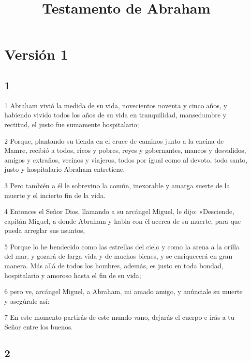 

\title{Testamento de Abraham}

\part{Versión 1}

\chapter{1}

\par 1 Abraham vivió la medida de su vida, novecientos noventa y cinco años, y habiendo vivido todos los años de su vida en tranquilidad, mansedumbre y rectitud, el justo fue sumamente hospitalario;

\par 2 Porque, plantando su tienda en el cruce de caminos junto a la encina de Mamre, recibió a todos, ricos y pobres, reyes y gobernantes, mancos y desvalidos, amigos y extraños, vecinos y viajeros, todos por igual como al devoto, todo santo, justo y hospitalario Abraham entretiene.

\par 3 Pero también a él le sobrevino la común, inexorable y amarga suerte de la muerte y el incierto fin de la vida.

\par 4 Entonces el Señor Dios, llamando a su arcángel Miguel, le dijo: «Desciende, capitán Miguel, a donde Abraham y habla con él acerca de su muerte, para que pueda arreglar sus asuntos,

\par 5 Porque lo he bendecido como las estrellas del cielo y como la arena a la orilla del mar, y gozará de larga vida y de muchos bienes, y se enriquecerá en gran manera. Más allá de todos los hombres, además, es justo en toda bondad, hospitalario y amoroso hasta el fin de su vida;

\par 6 pero ve, arcángel Miguel, a Abraham, mi amado amigo, y anúnciale su muerte y asegúrale así:

\par 7 En este momento partirás de este mundo vano, dejarás el cuerpo e irás a tu Señor entre los buenos.

\chapter{2}

